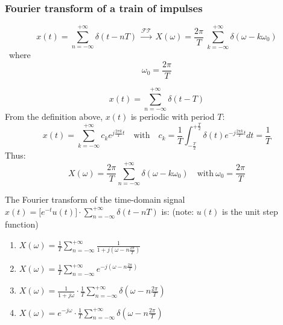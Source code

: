 \subsubsection{Fourier transform of a train of impulses}
\[ 
x(t) = \sum_{n=-\infty}^{+\infty} \delta(t-nT) \ \xrightarrow{\mathcal{FT}}\ X(\omega)=\frac{2\pi}{T}  \ \sum^{+\infty}_{k=-\infty} \delta(\omega-k\omega_{0}) \]
\ where \[ \omega_{0}=\frac{2\pi}{T} 
\]

\begin{dv}{}
    \[ x(t) = \sum_{n=-\infty}^{+\infty} \delta(t-T) \]
    From the definition above, $x(t)$ is periodic with period $T$:
    \[ x(t) = \sum_{k=-\infty}^{+\infty}c_{k}e^{j \frac{2\pi k}{T}t} \quad \text{with} \quad c_{k} = \frac{1}{T} \int_{-\frac{T}{2}}^{+\frac{T}{2}} \delta(t)e^{-j \frac{2\pi k}{T}t} dt = \frac{1}{T} \]
    Thus:
    \[ X(\omega) = \frac{2\pi}{T}\sum_{n=-\infty}^{+\infty}  \delta(\omega-k\omega_{0}) \quad  \text{with}\  \omega_{0}=\frac{2\pi}{T}\]
\end{dv}

\begin{q}{}
The Fourier transform of the time-domain signal $\displaystyle x(t) = \bigg[ e^{-t} u(t) \bigg] \cdot \sum_{n=-\infty}^{+\infty} \delta(t-nT)$ is: (note: $u(t)$ is the unit step function) 

\begin{enumerate}[label=(\alph*)]
    \item $X(\omega) = \frac{1}{T} \sum_{n=-\infty}^{+\infty} \frac{1}{1+j(\omega - n \frac{2\pi}{T})}$
    \item $X(\omega) = \frac{1}{T} \sum_{n=-\infty}^{+\infty} e^{-j(\omega - n \frac{2\pi}{T})}$
    \item $X(\omega) = \frac{1}{1+j\omega} \cdot \frac{1}{T} \sum_{n=-\infty}^{+\infty} \delta(\omega - n \frac{2\pi}{T})$
    \item $X(\omega) = e^{-j\omega} \cdot \frac{1}{T} \sum_{n=-\infty}^{+\infty} \delta(\omega - n \frac{2\pi}{T})$
\end{enumerate}
\end{q}